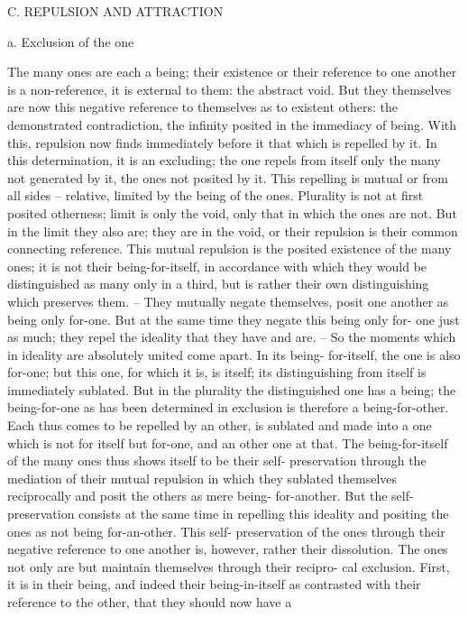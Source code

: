 C. REPULSION AND ATTRACTION

a. Exclusion of the one

The many ones are each a being; their existence or their reference to
one another is a non-reference, it is external to them: the abstract void.
But they themselves are now this negative reference to themselves as to
existent others: the demonstrated contradiction, the infinity posited in the
immediacy of being. With this, repulsion now finds immediately before it
that which is repelled by it. In this determination, it is an excluding; the one
repels from itself only the many not generated by it, the ones not posited
by it. This repelling is mutual or from all sides – relative, limited by the
being of the ones.
Plurality is not at first posited otherness; limit is only the void, only that
in which the ones are not. But in the limit they also are; they are in the
void, or their repulsion is their common connecting reference.
This mutual repulsion is the posited existence of the many ones; it is not
their being-for-itself, in accordance with which they would be distinguished
as many only in a third, but is rather their own distinguishing which
preserves them. – They mutually negate themselves, posit one another as
being only for-one. But at the same time they negate this being only for-
one just as much; they repel the ideality that they have and are. – So the
moments which in ideality are absolutely united come apart. In its being-
for-itself, the one is also for-one; but this one, for which it is, is itself; its
distinguishing from itself is immediately sublated. But in the plurality the
distinguished one has a being; the being-for-one as has been determined
in exclusion is therefore a being-for-other. Each thus comes to be repelled
by an other, is sublated and made into a one which is not for itself but
for-one, and an other one at that.
The being-for-itself of the many ones thus shows itself to be their self-
preservation through the mediation of their mutual repulsion in which
they sublated themselves reciprocally and posit the others as mere being-
for-another. But the self-preservation consists at the same time in repelling
this ideality and positing the ones as not being for-an-other. This self-
preservation of the ones through their negative reference to one another is,
however, rather their dissolution.
The ones not only are but maintain themselves through their recipro-
cal exclusion. First, it is in their being, and indeed their being-in-itself as
contrasted with their reference to the other, that they should now have a
